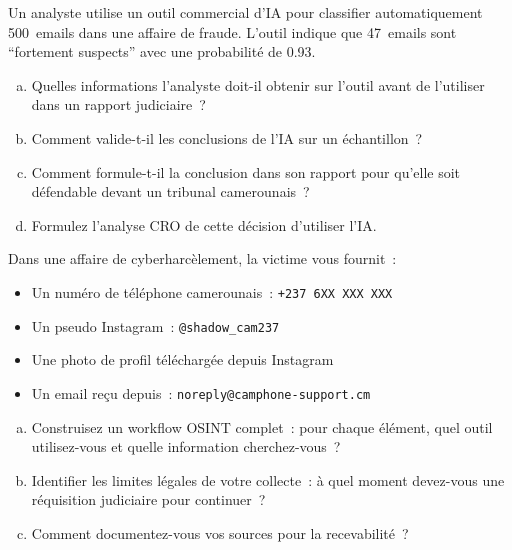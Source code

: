 \begin{boxexo}[title={\ding{45}\quad Exercice~5.1 --- Évaluation d'un outil IA \niveaubase}]
Un analyste utilise un outil commercial d'IA pour classifier automatiquement
500~emails dans une affaire de fraude. L'outil indique que 47~emails sont
``fortement suspects'' avec une probabilité de 0.93.

\begin{enumerate}[(a)]
    \item Quelles informations l'analyste doit-il obtenir sur l'outil
          avant de l'utiliser dans un rapport judiciaire~?
    \item Comment valide-t-il les conclusions de l'IA sur un échantillon~?
    \item Comment formule-t-il la conclusion dans son rapport pour
          qu'elle soit défendable devant un tribunal camerounais~?
    \item Formulez l'analyse CRO de cette décision d'utiliser l'IA.
\end{enumerate}
\end{boxexo}

\begin{boxexo}[title={\ding{45}\quad Exercice~5.2 --- Workflow OSINT \niveaumoyen}]
Dans une affaire de cyberharcèlement, la victime vous fournit~:
\begin{itemize}
    \item Un numéro de téléphone camerounais~: \texttt{+237 6XX XXX XXX}
    \item Un pseudo Instagram~: \texttt{@shadow\_cam237}
    \item Une photo de profil téléchargée depuis Instagram
    \item Un email reçu depuis~: \texttt{noreply@camphone-support.cm}
\end{itemize}

\begin{enumerate}[(a)]
    \item Construisez un workflow OSINT complet~: pour chaque élément,
          quel outil utilisez-vous et quelle information cherchez-vous~?
    \item Identifier les limites légales de votre collecte~: à quel
          moment devez-vous une réquisition judiciaire pour continuer~?
    \item Comment documentez-vous vos sources pour la recevabilité~?
\end{enumerate}
\end{boxexo}

